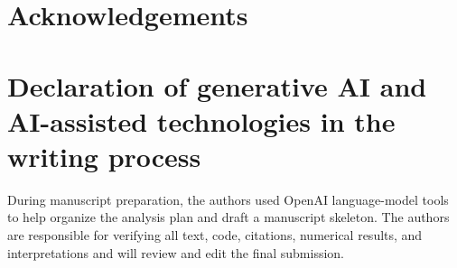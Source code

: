 \section*{Acknowledgements}

\section*{Declaration of generative AI and AI-assisted technologies in the writing process}
During manuscript preparation, the authors used OpenAI language-model tools to help organize the analysis plan and draft a manuscript skeleton. The authors are responsible for verifying all text, code, citations, numerical results, and interpretations and will review and edit the final submission. 
